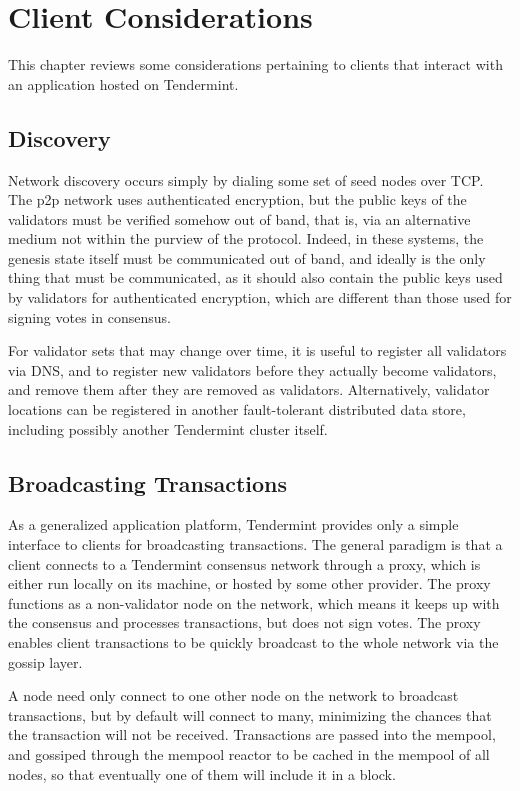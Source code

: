 \chapter{Client Considerations}
\label{ch:clients}

This chapter reviews some considerations pertaining to clients that interact with an application hosted on Tendermint.

\section{Discovery}

Network discovery occurs simply by dialing some set of seed nodes over TCP.
The p2p network uses authenticated encryption, 
but the public keys of the validators must be verified somehow out of band, 
that is, via an alternative medium not within the purview of the protocol.
Indeed, in these systems, the genesis state itself must be communicated out of band, 
and ideally is the only thing that must be communicated, 
as it should also contain the public keys used by validators for authenticated encryption, 
which are different than those used for signing votes in consensus.

For validator sets that may change over time, it is useful to register all validators via DNS, 
and to register new validators before they actually become validators, and remove them after they are removed as validators.
Alternatively, validator locations can be registered in another fault-tolerant distributed data store, 
including possibly another Tendermint cluster itself.

\section{Broadcasting Transactions}

As a generalized application platform, Tendermint provides only a simple interface to clients for broadcasting transactions.
The general paradigm is that a client connects to a Tendermint consensus network through a proxy, which is either run locally on its machine,
or hosted by some other provider. The proxy functions as a non-validator node on the network, 
which means it keeps up with the consensus and processes transactions, but does not sign votes.
The proxy enables client transactions to be quickly broadcast to the whole network via the gossip layer.

A node need only connect to one other node on the network to broadcast transactions, but by default will connect to many,
minimizing the chances that the transaction will not be received.
Transactions are passed into the mempool, 
and gossiped through the mempool reactor to be cached in the mempool of all nodes, 
so that eventually one of them will include it in a block. 

